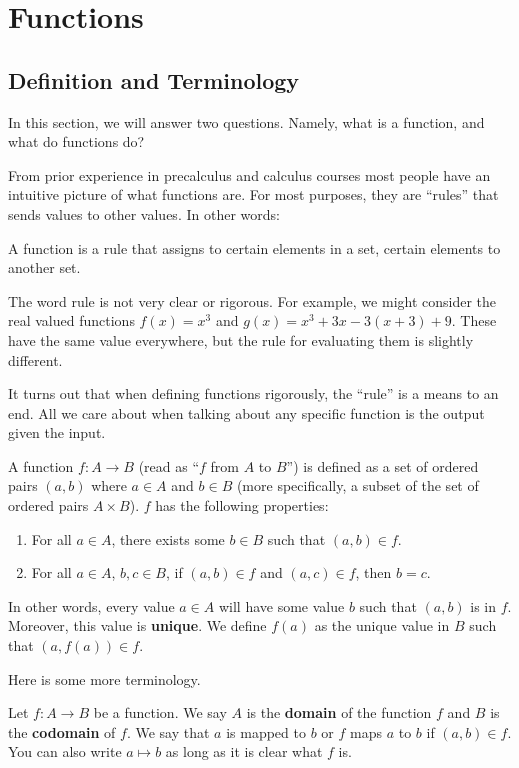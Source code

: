 \section{Functions}

\subsection{Definition and Terminology}
In this section, we will answer two questions. Namely, what is a function, and what do functions do?

From prior experience in precalculus and calculus courses most people have an intuitive picture of what functions are. For most purposes, they are ``rules'' that sends values to other values. In other words:

\begin{tcolorbox}
A function is a rule that assigns to certain elements in a set, certain elements to another set.
\end{tcolorbox}

The word rule is not very clear or rigorous. For example, we might consider the real valued functions $f(x) = x^3$ and $g(x) = x^3 + 3x - 3(x + 3) + 9$. These have the same value everywhere, but the rule for evaluating them is slightly different.

It turns out that when defining functions rigorously, the ``rule'' is a means to an end. All we care about when talking about any specific function is the output given the input. 

\begin{definition}
A function $f:A \to B$ (read as ``$f$ from $A$ to $B$'') is defined as a set of ordered pairs $(a, b)$ where $a \in A$ and $b \in B$ (more specifically, a subset of the set of ordered pairs $A \times B$). $f$ has the following properties:
\begin{enumerate}
    \item For all $a \in A$, there exists some $b \in B$ such that $(a, b) \in f$.
    \item For all $a \in A$, $b, c \in B$, if $(a,b) \in f$ and $(a, c) \in f$, then $b = c$.
\end{enumerate}
\end{definition}

In other words, every value $a \in A$ will have some value $b$ such that $(a, b)$ is in $f$. Moreover, this value is \textbf{unique}. We define $f(a)$ as the unique value in $B$ such that $(a, f(a)) \in f$.

Here is some more terminology.
\begin{definition}
Let $f: A \to B$ be a function. We say $A$ is the \textbf{domain} of the function $f$ and $B$ is the \textbf{codomain} of $f$. We say that $a$ is mapped to $b$ or $f$ maps $a$ to $b$ if $(a, b) \in f$. You can also write $a \mapsto b$ as long as it is clear what $f$ is.
\end{definition}

